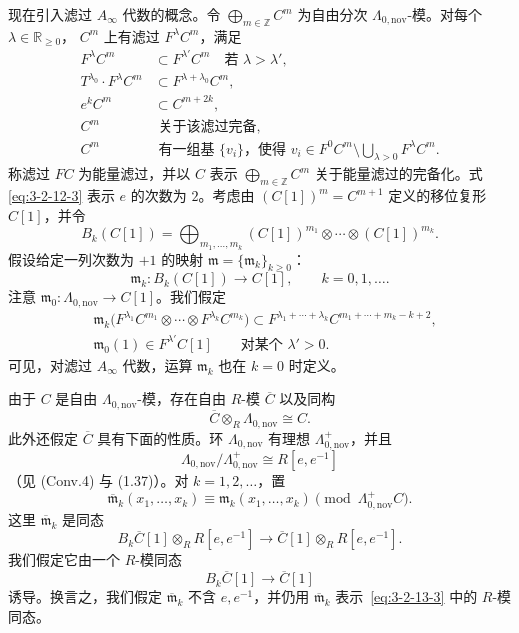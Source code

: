 现在引入滤过 $A_\infty$ 代数的概念。令
$\bigoplus_{m\in\mathbb Z}C^m$ 为自由分次
$\Lambda_{0,\mathrm{nov}}$-模。对每个 $\lambda\in\mathbb R_{\geq0}$，
$C^m$ 上有滤过 $F^\lambda C^m$，满足
\begin{align}
  F^\lambda C^m&\subset F^{\lambda'}C^m
    \quad\text{若 }\lambda>\lambda',
    \tag{3.2.12.1}\label{eq:3-2-12-1}\\
  T^{\lambda_0}\cdot F^\lambda C^m
    &\subset F^{\lambda+\lambda_0}C^m,
    \tag{3.2.12.2}\label{eq:3-2-12-2}\\
  e^kC^m&\subset C^{m+2k},
    \tag{3.2.12.3}\label{eq:3-2-12-3}\\
  C^m&\text{ 关于该滤过完备},
    \tag{3.2.12.4}\label{eq:3-2-12-4}\\
  C^m&\text{ 有一组基 }\{v_i\}\text{，使得 }
  v_i\in F^0C^m\setminus\bigcup_{\lambda>0}F^\lambda C^m.
    \tag{3.2.12.5}\label{eq:3-2-12-5}
\end{align}
称滤过 $F C$ 为能量滤过，并以 $C$ 表示
$\bigoplus_{m\in\mathbb Z}C^m$ 关于能量滤过的完备化。式
\eqref{eq:3-2-12-3} 表示 $e$ 的次数为 $2$。考虑由
$(C[1])^m=C^{m+1}$ 定义的移位复形 $C[1]$，并令
\[
  B_k(C[1])
  =\bigoplus_{m_1,\ldots,m_k}
  (C[1])^{m_1}\otimes\cdots\otimes(C[1])^{m_k}.
\]
假设给定一列次数为 $+1$ 的映射
$\mathfrak m=\{\mathfrak m_k\}_{k\geq0}$：
\[
  \mathfrak m_k\colon B_k(C[1])\longrightarrow C[1],
  \qquad k=0,1,\ldots.
\]
注意 $\mathfrak m_0\colon\Lambda_{0,\mathrm{nov}}\to C[1]$。我们假定
\begin{align}
  &\mathfrak m_k\bigl(
  F^{\lambda_1}C^{m_1}\otimes\cdots\otimes
  F^{\lambda_k}C^{m_k}\bigr)
  \subset
  F^{\lambda_1+\cdots+\lambda_k}
  C^{m_1+\cdots+m_k-k+2},
  \tag{3.2.12.6}\label{eq:3-2-12-6}\\
  &\mathfrak m_0(1)\in F^{\lambda'}C[1]
  \qquad\text{对某个 }\lambda'>0.
  \tag{3.2.12.7}\label{eq:3-2-12-7}
\end{align}
可见，对滤过 $A_\infty$ 代数，运算 $\mathfrak m_k$ 也在 $k=0$ 时定义。

由于 $C$ 是自由 $\Lambda_{0,\mathrm{nov}}$-模，存在自由 $R$-模
$\overline C$ 以及同构
\begin{equation}
  \overline C\otimes_R\Lambda_{0,\mathrm{nov}}\cong C.
  \tag{3.2.13.1}\label{eq:3-2-13-1}
\end{equation}
此外还假定 $\overline C$ 具有下面的性质。环 $\Lambda_{0,\mathrm{nov}}$
有理想 $\Lambda^+_{0,\mathrm{nov}}$，并且
\[
  \Lambda_{0,\mathrm{nov}}/\Lambda^+_{0,\mathrm{nov}}
  \cong R[e,e^{-1}]
\]
（见 (Conv.4) 与 (1.37)）。对 $k=1,2,\ldots$，置
\begin{equation}
  \overline{\mathfrak m}_k(x_1,\ldots,x_k)
  \equiv\mathfrak m_k(x_1,\ldots,x_k)
  \pmod{\Lambda^+_{0,\mathrm{nov}}C}.
  \tag{3.2.13.2}\label{eq:3-2-13-2}
\end{equation}
这里 $\overline{\mathfrak m}_k$ 是同态
\[
  B_k\overline C[1]\otimes_RR[e,e^{-1}]
  \longrightarrow\overline C[1]\otimes_RR[e,e^{-1}].
\]
我们假定它由一个 $R$-模同态
\begin{equation}
  B_k\overline C[1]\longrightarrow\overline C[1]
  \tag{3.2.13.3}\label{eq:3-2-13-3}
\end{equation}
诱导。换言之，我们假定 $\overline{\mathfrak m}_k$ 不含 $e,e^{-1}$，并仍用
$\overline{\mathfrak m}_k$ 表示~\eqref{eq:3-2-13-3} 中的 $R$-模同态。

